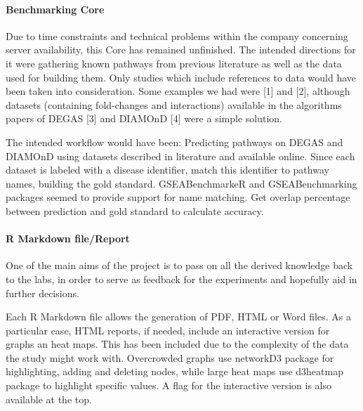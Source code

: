 \paragraph{Benchmarking Core}
Due to time constraints and technical problems within the company concerning server availability, this Core has remained unfinished.
The intended directions for it were gathering known pathways from previous literature as well as the data used for building them. Only studies which include references to data would have been taken into consideration. Some examples we had were [1] and [2], although datasets (containing fold-changes and interactions) available in the algorithms papers of DEGAS [3] and DIAMOnD [4] were a simple solution. 

The intended workflow would have been:
Predicting pathways on DEGAS and DIAMOnD using datasets described in literature and available online.
Since each dataset is labeled with a disease identifier, match this identifier to pathway names, building the gold standard. GSEABenchmarkeR and GSEABenchmarking packages seemed to provide support for name matching.
Get overlap percentage between prediction and gold standard to calculate accuracy.

\paragraph{R Markdown file/Report}
One of the main aims of the project is to pass on all the derived knowledge back to the labs, in order to serve as feedback for the experiments and hopefully aid in further decisions.

Each R Markdown file allows the generation of PDF, HTML or Word files. As a particular case, HTML reports, if needed, include an interactive version for graphs an heat maps. This has been included due to the complexity of the data the study might work with. Overcrowded graphs use networkD3 package for highlighting, adding and deleting nodes, while large heat maps use d3heatmap package to highlight specific values. A flag for the interactive version is also available at the top.